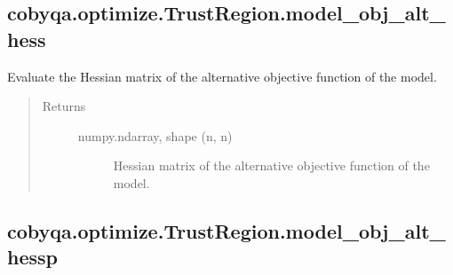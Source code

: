 \documentclass[letterpaper,10pt,english]{sphinxmanual}
\begin{document}
\begin{fulllineitems}
\begin{fulllineitems}
\end{fulllineitems}



\subsection{cobyqa.optimize.TrustRegion.model\_obj\_alt\_hess}
\label{\detokenize{refs/generated/cobyqa.optimize.TrustRegion.model_obj_alt_hess:cobyqa-optimize-trustregion-model-obj-alt-hess}}\label{\detokenize{refs/generated/cobyqa.optimize.TrustRegion.model_obj_alt_hess::doc}}

\begin{fulllineitems}
\label{\detokenize{refs/generated/cobyqa.optimize.TrustRegion.model_obj_alt_hess:cobyqa.optimize.TrustRegion.model_obj_alt_hess}}
\sphinxAtStartPar
Evaluate the Hessian matrix of the alternative objective function of the
model.
\begin{quote}\begin{description}
\item[{Returns}] \leavevmode\begin{description}
\item[{numpy.ndarray, shape (n, n)}] \leavevmode
\sphinxAtStartPar
Hessian matrix of the alternative objective function of the model.

\end{description}

\end{description}\end{quote}

\end{fulllineitems}



\subsection{cobyqa.optimize.TrustRegion.model\_obj\_alt\_hessp}
\label{\detokenize{refs/generated/cobyqa.optimize.TrustRegion.model_obj_alt_hessp:cobyqa-optimize-trustregion-model-obj-alt-hessp}}\label{\detokenize{refs/generated/cobyqa.optimize.TrustRegion.model_obj_alt_hessp::doc}}


\end{fulllineitems}
\end{document}
